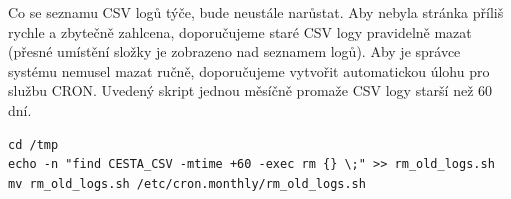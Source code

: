 Co se seznamu CSV logů týče, bude neustále narůstat. Aby nebyla stránka příliš rychle a zbytečně zahlcena, doporučujeme staré CSV logy pravidelně mazat (přesné umístění složky je zobrazeno nad seznamem logů). Aby je správce systému nemusel mazat ručně, doporučujeme vytvořit automatickou úlohu pro službu CRON. Uvedený skript jednou měsíčně promaže CSV logy starší než 60 dní.

\begin{verbatim}
cd /tmp
echo -n "find CESTA_CSV -mtime +60 -exec rm {} \;" >> rm_old_logs.sh
mv rm_old_logs.sh /etc/cron.monthly/rm_old_logs.sh
\end{verbatim}
